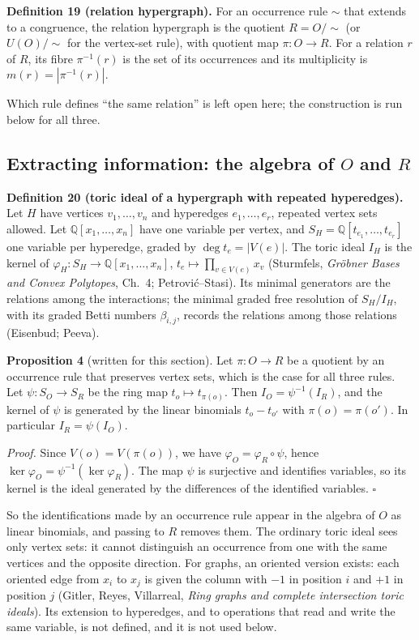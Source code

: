 \documentclass[11pt]{article}
\begin{document}
\textbf{Definition 19 (relation hypergraph).} For an occurrence rule $\sim$ that extends to a congruence, the relation hypergraph is the quotient $R=O/{\sim}$ (or $U(O)/{\sim}$ for the vertex-set rule), with quotient map $\pi:O\to R$. For a relation $r$ of $R$, its fibre $\pi^{-1}(r)$ is the set of its occurrences and its multiplicity is $m(r)=|\pi^{-1}(r)|$.

Which rule defines ``the same relation'' is left open here; the construction is run below for all three.

\subsection{Extracting information: the algebra of $O$ and $R$}

\textbf{Definition 20 (toric ideal of a hypergraph with repeated hyperedges).} Let $H$ have vertices $v_1,\dots,v_n$ and hyperedges $e_1,\dots,e_r$, repeated vertex sets allowed. Let $\mathbb{Q}[x_1,\dots,x_n]$ have one variable per vertex, and $S_H=\mathbb{Q}[t_{e_1},\dots,t_{e_r}]$ one variable per hyperedge, graded by $\deg t_e=|V(e)|$. The toric ideal $I_H$ is the kernel of $\varphi_H:S_H\to\mathbb{Q}[x_1,\dots,x_n]$, $t_e\mapsto\prod_{v\in V(e)}x_v$ (Sturmfels, \emph{Gröbner Bases and Convex Polytopes}, Ch.~4; Petrović--Stasi). Its minimal generators are the relations among the interactions; the minimal graded free resolution of $S_H/I_H$, with its graded Betti numbers $\beta_{i,j}$, records the relations among those relations (Eisenbud; Peeva).

\textbf{Proposition 4} (written for this section). Let $\pi:O\to R$ be a quotient by an occurrence rule that preserves vertex sets, which is the case for all three rules. Let $\psi:S_O\to S_R$ be the ring map $t_o\mapsto t_{\pi(o)}$. Then $I_O=\psi^{-1}(I_R)$, and the kernel of $\psi$ is generated by the linear binomials $t_o-t_{o'}$ with $\pi(o)=\pi(o')$. In particular $I_R=\psi(I_O)$.

\emph{Proof.} Since $V(o)=V(\pi(o))$, we have $\varphi_O=\varphi_R\circ\psi$, hence $\ker\varphi_O=\psi^{-1}(\ker\varphi_R)$. The map $\psi$ is surjective and identifies variables, so its kernel is the ideal generated by the differences of the identified variables. $\square$

So the identifications made by an occurrence rule appear in the algebra of $O$ as linear binomials, and passing to $R$ removes them. The ordinary toric ideal sees only vertex sets: it cannot distinguish an occurrence from one with the same vertices and the opposite direction. For graphs, an oriented version exists: each oriented edge from $x_i$ to $x_j$ is given the column with $-1$ in position $i$ and $+1$ in position $j$ (Gitler, Reyes, Villarreal, \emph{Ring graphs and complete intersection toric ideals}). Its extension to hyperedges, and to operations that read and write the same variable, is not defined, and it is not used below.
\end{document}
